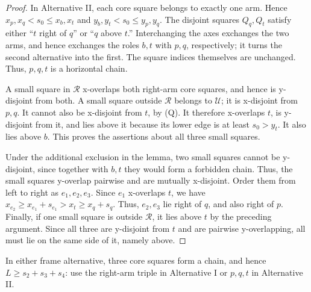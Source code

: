 \documentclass[12pt]{amsart}
\theoremstyle{definition}
\theoremstyle{remark}
\numberwithin{equation}{section}
\numberwithin{figure}{section}
\numberwithin{table}{section}
\begin{document}
\begin{proof}
In Alternative II, each core square belongs to exactly one arm. Hence
\(x_p,x_q<s_0\le x_b,x_t\) and \(y_b,y_t<s_0\le y_p,y_q\).
The disjoint squares \(Q_q,Q_t\) satisfy either ``\(t\) right of
\(q\)'' or ``\(q\) above \(t\).'' Interchanging the axes exchanges the two
arms, and hence exchanges the roles \(b,t\) with \(p,q\), respectively; it
turns the second alternative into the first. The square indices themselves
are unchanged. Thus,
\(p,q,t\) is a horizontal chain.

A small square in \(\mathcal R\) x-overlaps both right-arm core
squares, and hence is y-disjoint from both. A small square outside
\(\mathcal R\) belongs to \(\mathcal U\); it is x-disjoint from \(p,q\).
It cannot also be x-disjoint from \(t\), by (Q). It therefore x-overlaps \(t\), is y-disjoint from it, and lies above it because its lower
edge is at least \(s_0>y_t\). It also lies above \(b\). This proves the
assertions about all three small squares.

Under the additional exclusion in the lemma, two small squares cannot be
y-disjoint, since together with \(b,t\) they would form a forbidden
chain. Thus, the small squares y-overlap pairwise and are mutually
x-disjoint. Order them from left to right as \(e_1,e_2,e_3\). Since \(e_1\)
x-overlaps \(t\), we have
\(x_{e_2}\ge x_{e_1}+s_{e_1}>x_t\ge x_q+s_q\). Thus, \(e_2,e_3\) lie right of \(q\), and also right of \(p\).
Finally, if one small square is outside \(\mathcal R\), it lies above \(t\)
by the preceding argument. Since all three are y-disjoint from \(t\) and are pairwise y-overlapping, all must lie on the same side of it, namely above.
\end{proof}

In either frame alternative, three core squares form a chain, and hence
$L\ge s_2+s_3+s_4$: use the right-arm triple in Alternative I or
$p,q,t$ in Alternative II.
\end{document}
